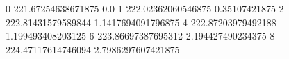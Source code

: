 0 221.67254638671875 0.0
1 222.02362060546875 0.35107421875
2 222.81431579589844 1.1417694091796875
4 222.87203979492188 1.199493408203125
6 223.86697387695312 2.194427490234375
8 224.47117614746094 2.7986297607421875
